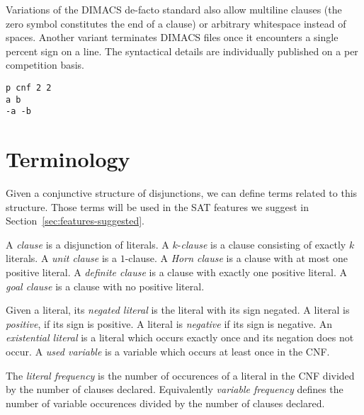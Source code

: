 Variations of the DIMACS de-facto standard also allow multiline clauses (the
zero symbol constitutes the end of a clause) or arbitrary whitespace instead of
spaces. Another variant terminates DIMACS files once it encounters a single
percent sign on a line. The syntactical details are individually published
on a per competition basis.

\renewcommand{\lstlistingname}{Listing}  %
\begin{lstlisting}[caption={Display~\ref{eq:xor} represented in DIMACS format}]
p cnf 2 2
a b
-a -b
\end{lstlisting}

\section{Terminology}
\label{sec:sat-terminology}
%
Given a conjunctive structure of disjunctions, we can define terms
related to this structure. Those terms will be used in the SAT features
we suggest in Section~\ref{sec:features-suggested}.

\begin{defi}
  A \emph{clause} is a disjunction of literals.
  A $k$-\emph{clause} is a clause consisting of exactly $k$ literals.
  A \emph{unit clause} is a $1$-clause.
  A \emph{Horn clause} is a clause with at most one positive literal.
  A \emph{definite clause} is a clause with exactly one positive literal.
  A \emph{goal clause} is a clause with no positive literal.
\end{defi}

\begin{defi}
  Given a literal, its \emph{negated literal} is the literal with its sign negated.
  A literal is \emph{positive}, if its sign is positive. A literal is \emph{negative} if its sign is negative.
  An \emph{existential literal} is a literal which occurs exactly once and
  its negation does not occur. A \emph{used variable} is a variable which
  occurs at least once in the CNF.

  The \emph{literal frequency} is the number of occurences of a literal in the CNF divided by the number of clauses declared.
  Equivalently \emph{variable frequency} defines the number of variable occurences divided by the number of clauses declared.
\end{defi}

